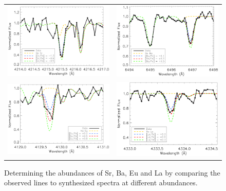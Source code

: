\documentclass{emulateapj}
\begin{document}
\begin{figure}
 \begin{center}
  \begin{tabular}{cc}
  \includegraphics[width=8.5cm]{sr4215_synth.ps} & \includegraphics[width=8.5cm]{ba6496_synth.ps} \\
  \includegraphics[width=8.5cm]{eu4129_synth.ps} &  \includegraphics[width=8.5cm]{la4333_synth.ps} \\
  \end{tabular}
  \caption{Determining the abundances of Sr, Ba, Eu and La by comparing the observed lines to synthesized spectra at different abundances. }
  \label{fig:nc_syn}
 \end{center}
\end{figure}
\end{document}
